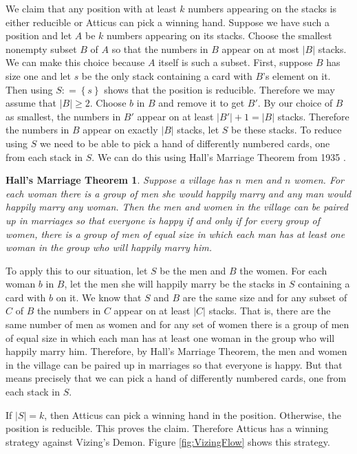 \documentclass[12pt]{article}
\theoremstyle{plain}
\newtheorem*{hall}{Hall's Marriage Theorem}
\theoremstyle{definition}
\theoremstyle{remark}
\newcommand{\set}[1]{\left\{ #1 \right\}}
\newcommand{\card}[1]{\left|#1\right|}
\newcommand{\DefinedAs}{\mathrel{\mathop:}=}
\begin{document}
We claim that any position with at least $k$ numbers appearing on the stacks is either reducible or Atticus can pick a winning hand.  Suppose we have such a position and let $A$ be $k$ numbers appearing on its stacks. Choose the smallest nonempty subset $B$ of $A$ so that the numbers in $B$ appear on at most $\card{B}$ stacks.  We can make this choice because $A$ itself is such a subset.  First, suppose $B$ has size one and let $s$ be the only stack containing a card with $B$'s element on it.  Then using $S \DefinedAs \set{s}$ shows that the position is reducible.  Therefore we may assume that $\card{B} \geq 2$. Choose $b$ in $B$ and remove it to get $B'$.  By our choice of $B$ as smallest, the numbers in $B'$ appear on at least $\card{B'} + 1 = \card{B}$ stacks.  Therefore the numbers in $B$ appear on exactly $\card{B}$ stacks, let $S$ be these stacks.  To reduce using $S$ we need to be able to pick a hand of differently numbered cards, one from each stack in $S$.  We can do this using Hall's Marriage Theorem from 1935 \cite{hall}.

\begin{hall}
Suppose a village has $n$ men and $n$ women.  For each woman there is a group of  men she would happily marry and any man would happily marry any woman.  Then the men and women in the village can be paired up in marriages so that everyone is happy if and only if for every group of women, there is a group of men of equal size in which each man has at least one woman in the group who will happily marry him.
\end{hall}

To apply this to our situation, let $S$ be the men and $B$ the women.  For each woman $b$ in $B$, let the men she will happily marry be the stacks in $S$ containing a card with $b$ on it.  We know that $S$ and $B$ are the same size and for any subset of $C$ of $B$ the numbers in $C$ appear on at least $\card{C}$ stacks.  That is, there are the same number of men as women and for any set of women there is a group of men of equal size in which each man has at least one woman in the group who will happily marry him.  Therefore, by Hall's Marriage Theorem, the men and women in the village can be paired up in marriages so that everyone is happy.  But that means precisely that we can pick a hand of differently numbered cards, one from each stack in $S$.

If $\card{S} = k$, then Atticus can pick a winning hand in the position.  Otherwise, the position is reducible.  This proves the claim. Therefore Atticus has a winning strategy against Vizing's Demon.  Figure \ref{fig:VizingFlow} shows this strategy.
\end{document}
